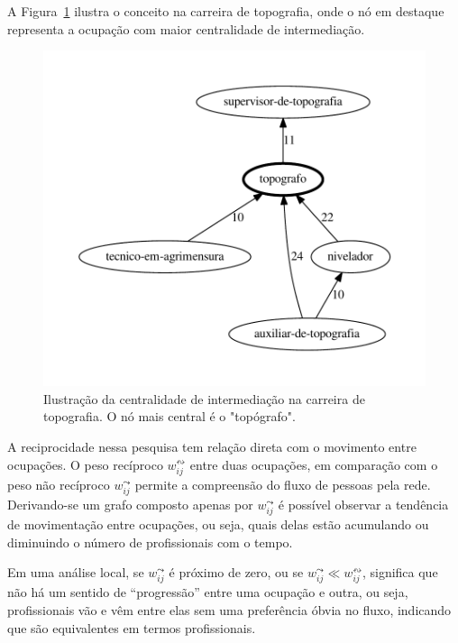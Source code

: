 \documentclass[12pt,a4paper,final]{article}
\newcommand{\recout}[1]{#1^\leadsto} %
\newcommand{\recboth}[1]{#1^\leftrightsquigarrow} %
\begin{document}

A Figura~\ref{fig:carreira-topografia} ilustra o conceito na carreira de topografia, onde o nó em destaque representa a ocupação com maior centralidade de intermediação.

\begin{figure}[ht]
  \centering
  \includegraphics[scale=0.6]{cluster_25.pdf}
  \caption{Ilustração da centralidade de intermediação na carreira de topografia. O nó mais central é o "topógrafo".}
  \label{fig:carreira-topografia}
\end{figure}

A reciprocidade nessa pesquisa tem relação direta com o movimento entre ocupações. O peso recíproco $\recboth{w}_{ij}$ entre duas ocupações, em comparação com o peso não recíproco $\recout{w}_{ij}$ permite a compreensão do fluxo de pessoas pela rede. Derivando-se um grafo composto apenas por $\recout{w}_{ij}$ é possível observar a tendência de movimentação entre ocupações, ou seja, quais delas estão acumulando ou diminuindo o número de profissionais com o tempo.

\begin{hypothesis} \label{hip:equivalencia}
    Em uma análise local, se $\recout{w}_{ij}$ é próximo de zero, ou se $\recout{w}_{ij} \ll \recboth{w}_{ij}$, significa que não há um sentido de \enquote{progressão} entre uma ocupação e outra, ou seja, profissionais vão e vêm entre elas sem uma preferência óbvia no fluxo, indicando que são equivalentes em termos profissionais.
\end{hypothesis}
\end{document}
